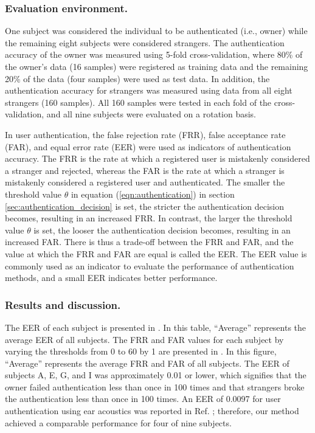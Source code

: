 \documentclass[english,preprint,JIP]{ipsj}
\begin{document}
\subsubsection{Evaluation environment.}
One subject was considered the individual to be authenticated (i.e., owner) while the remaining eight subjects were considered strangers. The authentication accuracy of the owner was measured using 5-fold cross-validation, where 80\% of the owner's data (16 samples) were registered as training data and the remaining 20\% of the data (four samples) were used as test data. In addition, the authentication accuracy for strangers was measured using data from all eight strangers (160 samples). All 160 samples were tested in each fold of the cross-validation, and all nine subjects were evaluated on a rotation basis.\par

In user authentication, the false rejection rate (FRR), false acceptance rate (FAR), and equal error rate (EER) were used as indicators of authentication accuracy. The FRR is the rate at which a registered user is mistakenly considered a stranger and rejected, whereas the FAR is the rate at which a stranger is mistakenly considered a registered user and authenticated. The smaller the threshold value $\theta$ in equation (\ref{eqn:authentication}) in section \ref{sec:authentication_decision} is set, the stricter the authentication decision becomes, resulting in an increased FRR. In contrast, the larger the threshold value $\theta$ is set, the looser the authentication decision becomes, resulting in an increased FAR. There is thus a trade-off between the FRR and FAR, and the value at which the FRR and FAR are equal is called the EER. The EER value is commonly used as an indicator to evaluate the performance of authentication methods, and a small EER indicates better performance.


\subsubsection{Results and discussion.}
The EER of each subject is presented in . In this table, ``Average'' represents the average EER of all subjects. The FRR and FAR values for each subject by varying the thresholds from 0 to 60 by 1 are presented in . In this figure, ``Average'' represents the average FRR and FAR of all subjects. The EER of subjects A, E, G, and I was approximately 0.01 or lower, which signifies that the owner failed authentication less than once in 100 times and that strangers broke the authentication less than once in 100 times. An EER of 0.0097 for user authentication using ear acoustics was reported in Ref. \cite{ear_auth}; therefore, our method achieved a comparable performance for four of nine subjects.\par
\end{document}
